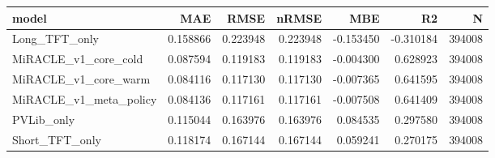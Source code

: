 \begin{tabular}{lrrrrrr}
\toprule
model & MAE & RMSE & nRMSE & MBE & R2 & N \\
\midrule
Long_TFT_only & 0.158866 & 0.223948 & 0.223948 & -0.153450 & -0.310184 & 394008 \\
MiRACLE_v1_core_cold & 0.087594 & 0.119183 & 0.119183 & -0.004300 & 0.628923 & 394008 \\
MiRACLE_v1_core_warm & 0.084116 & 0.117130 & 0.117130 & -0.007365 & 0.641595 & 394008 \\
MiRACLE_v1_meta_policy & 0.084136 & 0.117161 & 0.117161 & -0.007508 & 0.641409 & 394008 \\
PVLib_only & 0.115044 & 0.163976 & 0.163976 & 0.084535 & 0.297580 & 394008 \\
Short_TFT_only & 0.118174 & 0.167144 & 0.167144 & 0.059241 & 0.270175 & 394008 \\
\bottomrule
\end{tabular}
